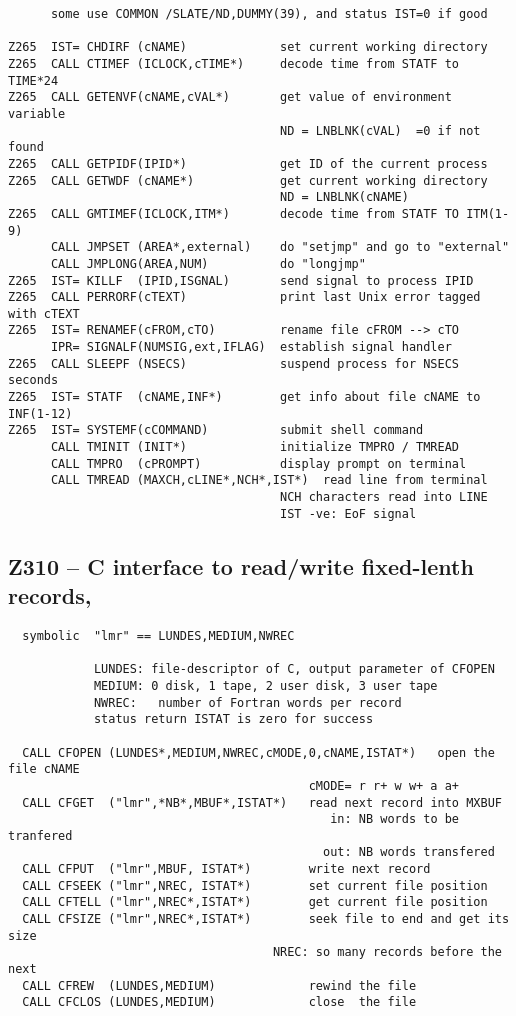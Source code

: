 \begin{verbatim}
      some use COMMON /SLATE/ND,DUMMY(39), and status IST=0 if good

Z265  IST= CHDIRF (cNAME)             set current working directory
Z265  CALL CTIMEF (ICLOCK,cTIME*)     decode time from STATF to TIME*24
Z265  CALL GETENVF(cNAME,cVAL*)       get value of environment variable
                                      ND = LNBLNK(cVAL)  =0 if not found
Z265  CALL GETPIDF(IPID*)             get ID of the current process
Z265  CALL GETWDF (cNAME*)            get current working directory
                                      ND = LNBLNK(cNAME)
Z265  CALL GMTIMEF(ICLOCK,ITM*)       decode time from STATF TO ITM(1-9)
      CALL JMPSET (AREA*,external)    do "setjmp" and go to "external"
      CALL JMPLONG(AREA,NUM)          do "longjmp"
Z265  IST= KILLF  (IPID,ISGNAL)       send signal to process IPID
Z265  CALL PERRORF(cTEXT)             print last Unix error tagged with cTEXT
Z265  IST= RENAMEF(cFROM,cTO)         rename file cFROM --> cTO
      IPR= SIGNALF(NUMSIG,ext,IFLAG)  establish signal handler
Z265  CALL SLEEPF (NSECS)             suspend process for NSECS seconds
Z265  IST= STATF  (cNAME,INF*)        get info about file cNAME to INF(1-12)
Z265  IST= SYSTEMF(cCOMMAND)          submit shell command
      CALL TMINIT (INIT*)             initialize TMPRO / TMREAD
      CALL TMPRO  (cPROMPT)           display prompt on terminal
      CALL TMREAD (MAXCH,cLINE*,NCH*,IST*)  read line from terminal
                                      NCH characters read into LINE
                                      IST -ve: EoF signal
\end{verbatim}

\subsection*{Z310 -- C interface to read/write fixed-lenth records, }

\begin{verbatim}
  symbolic  "lmr" == LUNDES,MEDIUM,NWREC

            LUNDES: file-descriptor of C, output parameter of CFOPEN
            MEDIUM: 0 disk, 1 tape, 2 user disk, 3 user tape
            NWREC:   number of Fortran words per record
            status return ISTAT is zero for success

  CALL CFOPEN (LUNDES*,MEDIUM,NWREC,cMODE,0,cNAME,ISTAT*)   open the file cNAME
                                          cMODE= r r+ w w+ a a+
  CALL CFGET  ("lmr",*NB*,MBUF*,ISTAT*)   read next record into MXBUF
                                             in: NB words to be tranfered
                                            out: NB words transfered
  CALL CFPUT  ("lmr",MBUF, ISTAT*)        write next record
  CALL CFSEEK ("lmr",NREC, ISTAT*)        set current file position
  CALL CFTELL ("lmr",NREC*,ISTAT*)        get current file position
  CALL CFSIZE ("lmr",NREC*,ISTAT*)        seek file to end and get its size
                                     NREC: so many records before the next
  CALL CFREW  (LUNDES,MEDIUM)             rewind the file
  CALL CFCLOS (LUNDES,MEDIUM)             close  the file
\end{verbatim}

